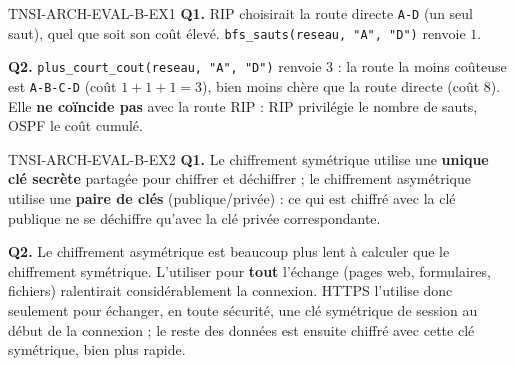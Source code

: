 \begin{corrige}{TNSI-ARCH-EVAL-B-EX1}
\textbf{Q1.} RIP choisirait la route directe \texttt{A-D} (un seul saut), quel que soit son coût élevé. \lstinline{bfs_sauts(reseau, "A", "D")} renvoie $1$.

\textbf{Q2.} \lstinline{plus_court_cout(reseau, "A", "D")} renvoie $3$ : la route la moins coûteuse est \texttt{A-B-C-D} (coût $1+1+1=3$), bien moins chère que la route directe (coût $8$). Elle \textbf{ne coïncide pas} avec la route RIP : RIP privilégie le nombre de sauts, OSPF le coût cumulé.
\end{corrige}

\begin{corrige}{TNSI-ARCH-EVAL-B-EX2}
\textbf{Q1.} Le chiffrement symétrique utilise une \textbf{unique clé secrète} partagée pour chiffrer et déchiffrer ; le chiffrement asymétrique utilise une \textbf{paire de clés} (publique/privée) : ce qui est chiffré avec la clé publique ne se déchiffre qu'avec la clé privée correspondante.

\textbf{Q2.} Le chiffrement asymétrique est beaucoup plus lent à calculer que le chiffrement symétrique. L'utiliser pour \textbf{tout} l'échange (pages web, formulaires, fichiers) ralentirait considérablement la connexion. HTTPS l'utilise donc seulement pour échanger, en toute sécurité, une clé symétrique de session au début de la connexion ; le reste des données est ensuite chiffré avec cette clé symétrique, bien plus rapide.
\end{corrige}
